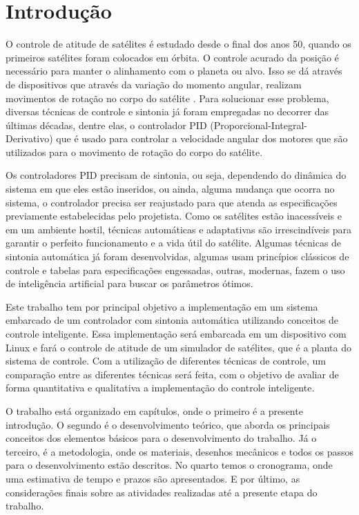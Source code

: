 \chapter[Introdução]{Introdução}

O controle de atitude de satélites é estudado desde o final dos anos 50, quando os primeiros satélites foram colocados em órbita. O controle acurado da posição é necessário para manter o alinhamento com o planeta ou alvo. Isso se dá através de dispositivos que através da variação do momento angular, realizam movimentos de rotação no corpo do satélite . Para solucionar esse problema, diversas técnicas de controle e sintonia já foram empregadas no decorrer das últimas décadas, dentre elas, o controlador PID (Proporcional-Integral-Derivativo) que é usado para controlar a velocidade angular dos motores que são utilizados para o movimento de rotação do corpo do satélite.

Os controladores PID precisam de sintonia, ou seja, dependendo do dinâmica do sistema em que eles estão inseridos, ou ainda, alguma mudança que ocorra no sistema, o controlador precisa ser reajustado para que atenda as especificações previamente estabelecidas pelo projetista. Como os satélites estão inacessíveis e em um ambiente hostil, técnicas automáticas e adaptativas são irrescindíveis para garantir o perfeito funcionamento e a vida útil do satélite. Algumas técnicas de sintonia automática já foram desenvolvidas, algumas usam princípios clássicos de controle e tabelas para especificações engessadas, outras, modernas, fazem o uso de inteligência artificial para buscar os parâmetros ótimos.


Este trabalho tem por principal objetivo a implementação em um sistema embarcado de um controlador com sintonia automática utilizando conceitos de controle inteligente. Essa implementação será embarcada em um dispositivo com Linux  e fará o controle de atitude de um simulador de satélites, que é a planta do sistema de controle. Com a utilização de diferentes técnicas de controle, um comparação entre as diferentes técnicas será feita, com o objetivo de avaliar de forma quantitativa e qualitativa a implementação do controle inteligente.

O trabalho está organizado em capítulos, onde o primeiro é a presente introdução. O segundo é o desenvolvimento teórico, que aborda os principais conceitos dos elementos básicos para o desenvolvimento do trabalho. Já o terceiro, é a metodologia, onde os materiais, desenhos mecânicos e todos os passos para o desenvolvimento estão descritos. No quarto temos o cronograma, onde uma estimativa de tempo e prazos são apresentados. E por último, as considerações finais sobre as atividades realizadas até a presente etapa do trabalho.











